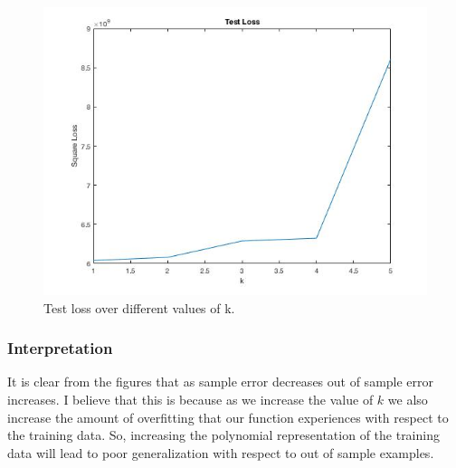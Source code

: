 \documentclass[11pt, oneside]{article}   	%
\begin{document}
\begin{figure}
  \includegraphics[width=\linewidth]{test-loss.jpg}
  \caption{Test loss over different values of k.}
\end{figure}

\subsubsection{Interpretation}
It is clear from the figures that as sample error decreases out of sample error increases.  I believe that this is because as we increase the value of $k$ we also increase the amount of overfitting that our function experiences with respect to the training data.  So, increasing the polynomial representation of the training data will lead to poor generalization with respect to out of sample examples.
\end{document}
